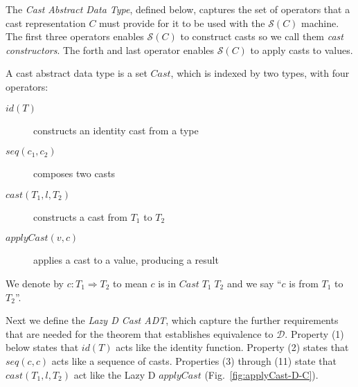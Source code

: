 \documentclass[acmsmall,review,anonymous]{acmart}\settopmatter{printfolios=true,printccs=false,printacmref=false}
\newcommand{\ineffCEKD}{$\mathcal{D}$}
\newcommand{\effCEK}[1]{$\mathcal{S}(#1)$}
\begin{document}
The \emph{Cast Abstract Data Type}, defined below, captures the set of
operators that a cast representation $C$ must provide for it to be
used with the \effCEK{C} machine.  The first three operators enables
\effCEK{C} to construct casts so we call them \textit{cast
  constructors}. The forth and last operator enables \effCEK{C} to
apply casts to values.

\begin{definition}
  \label{def:cast-rep}
  A cast abstract data type is a set $Cast$, which is indexed by two types, 
  with four operators:
  \begin{description}
  \item[$id(T)$] constructs an identity cast from a type
  \item[$seq(c_1,c_2)$] composes two casts
  \item[$cast(T_1,l,T_2)$] constructs a cast from $T_1$ to $T_2$
  \item[$ applyCast(v,c)$] applies a cast to a value, producing a result
  \end{description}
  We denote by $c : T_1 \Longrightarrow T_2$ to mean $c$ is in $Cast \; T_1 \; T_2$
  and we say ``$c$ is from $T_1$ to $T_2$''.
\end{definition}

Next we define the \emph{Lazy D Cast ADT}, which capture the further
requirements that are needed for the theorem that establishes
equivalence to \ineffCEKD{}. Property (1) below states that $id(T)$
acts like the identity function. Property (2) states that $seq(c,c)$
acts like a sequence of casts. Properties (3) through (11) state that
$cast(T_1,l,T_2)$ act like the Lazy D $applyCast$
(Fig.~\ref{fig:applyCast-D-C}).
\end{document}
